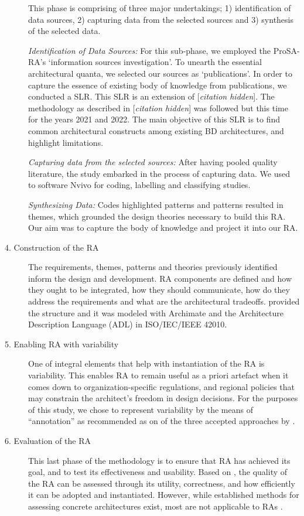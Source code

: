 \documentclass[a4paper,11pt]{article}
\let\cite\citep
\newcommand{\hc}{[\textit{citation hidden}]\textnormal{}}
\begin{document}
\begin{description}
This phase is comprising of three major undertakings; 1) identification of data sources, 2) capturing data from the selected sources and 3) synthesis of the selected data. 

\emph{Identification of Data Sources:} For this sub-phase, we employed the ProSA-RA's `information sources investigation'. To unearth the essential architectural quanta, we selected our sources as `publications'. In order to capture the essence of existing body of knowledge from publications, we conducted a SLR. This SLR is an extension of 
\hc{}.
 The methodology as described in 
 \hc{}
 was followed but this time for the years 2021 and 2022. The main objective of this SLR is to find common architectural constructs among existing BD architectures, and highlight limitations.



\emph{Capturing data from the selected sources:} After having pooled quality literature, the study embarked in the process of capturing data. We used to software Nvivo for coding, labelling and classifying studies. 

\emph{Synthesizing Data:} Codes highlighted patterns and patterns resulted in themes, which grounded the design theories necessary to build this RA. Our aim was to capture the body of knowledge and project it into our RA. 

\item[4. Construction of the RA] The requirements, themes, patterns and theories previously identified inform the design and development.  RA components are defined and how they ought to be integrated, how they should communicate, how do they address the requirements and what are the architectural tradeoffs.  \citet{ISO42010} provided the structure and it was modeled with Archimate and the Architecture Description Language (ADL) in ISO/IEC/IEEE 42010.

\item[5. Enabling RA with variability] One of integral elements that help with instantiation of the RA is variability. This enables RA to remain useful as a priori artefact when it comes down to organization-specific regulations, and regional policies that may constrain the architect's freedom in design decisions. For the purposes of this study, we chose to represent variability by the means of ``annotation'' as recommended as on of the three accepted approaches by \citet{galster2011empirically}.


\item[6. Evaluation of the RA] This last phase of the methodology is to ensure that RA has achieved its goal, and to test its effectiveness and usability. Based on \citet{galster2011empirically}, the quality of the RA can be assessed through its utility, correctness, and how efficiently it can be adopted and instantiated. However, while established methods for assessing concrete architectures exist, most are not applicable to RAs \cite{Avgeriou}. 


\end{description}
\end{document}
